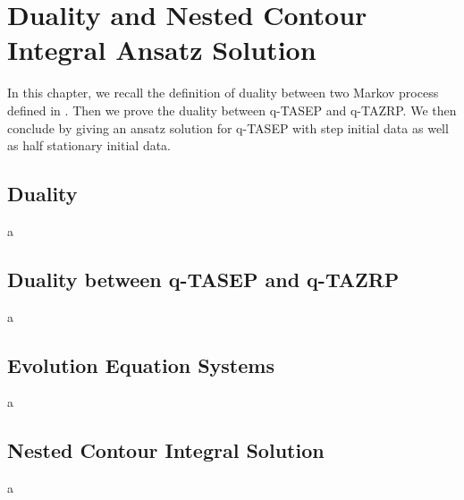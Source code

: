 \chapter{Duality and Nested Contour Integral Ansatz Solution}
In this chapter, we recall the definition of duality between two Markov process defined in \cite{interacting-particle-system}. Then we prove the duality between q-TASEP and q-TAZRP. We then conclude by giving an ansatz solution for q-TASEP with step initial data as well as half stationary initial data. 

\section{Duality}
a
\section{Duality between q-TASEP and q-TAZRP}
a
\section{Evolution Equation Systems}
a
\section{Nested Contour Integral Solution}
a